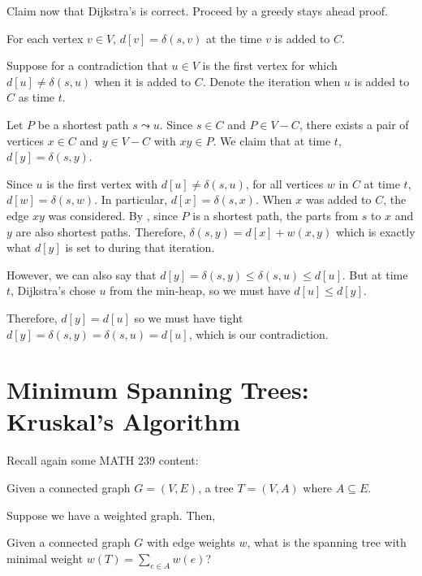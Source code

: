 Claim now that Dijkstra's is correct.
Proceed by a greedy stays ahead proof.

\begin{prop}
  For each vertex $v \in V$, $d[v] = \delta(s,v)$ at the time $v$ is added to $C$.
\end{prop}
\begin{prf}
  Suppose for a contradiction that $u \in V$
  is the first vertex for which $d[u] \neq \delta(s,u)$ when it is added to $C$.
  Denote the iteration when $u$ is added to $C$ as time $t$.

  Let $P$ be a shortest path $s \leadsto u$.
  Since $s \in C$ and $P \in V-C$,
  there exists a pair of vertices $x \in C$ and $y \in V-C$ with $xy \in P$.
  We claim that at time $t$, $d[y] = \delta(s,y)$.

  Since $u$ is the first vertex with $d[u] \neq \delta(s,u)$,
  for all vertices $w$ in $C$ at time $t$, $d[w] = \delta(s,w)$.
  In particular, $d[x] = \delta(s,x)$.
  When $x$ was added to $C$, the edge $xy$ was considered.
  By , since $P$ is a shortest path,
  the parts from $s$ to $x$ and $y$ are also shortest paths.
  Therefore, $\delta(s,y) = d[x] + w(x,y)$ which is exactly what
  $d[y]$ is set to during that iteration.

  However, we can also say that $d[y] = \delta(s,y) \leq \delta(s,u) \leq d[u]$.
  But at time $t$, Dijkstra's chose $u$ from the min-heap,
  so we must have $d[u] \leq d[y]$.

  Therefore, $d[y] = d[u]$ so we must have tight $d[y] = \delta(s,y) = \delta(s,u) = d[u]$,
  which is our contradiction.
\end{prf}

\section{Minimum Spanning Trees: Kruskal's Algorithm}

Recall again some MATH 239 content:

\begin{defn}
  Given a connected graph $G = (V,E)$,
  a tree $T = (V,A)$ where $A \subseteq E$.
\end{defn}

Suppose we have a weighted graph. Then,

\begin{problem}
  Given a connected graph $G$ with edge weights $w$,
  what is the spanning tree with minimal weight $w(T) = \sum_{e \in A}w(e)$?
\end{problem}

